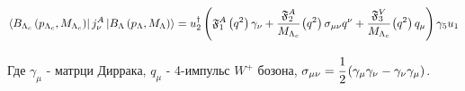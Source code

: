 \begin{equation}
    \bra{B_{\Lambda_c} \left( p_{\Lambda_c}, M_{\Lambda_c} \right)}
    j_\nu^A
    \ket{B_{\Lambda} \left( p_{\Lambda}, M_{\Lambda} \right)} = 
    u_2^\dag \left( \mathfrak F^A_1 \left( q^2 \right) \gamma_\nu + 
    \cfrac{\mathfrak F^A_2}{M_{\Lambda_c}} \left( q^2 \right) \sigma_{\mu\nu} q^\nu + 
    \cfrac{\mathfrak F^V_3}{M_{\Lambda_c}} \left( q^2 \right)q_\mu \right) \gamma_5 u_1 
\end{equation}

Где $\gamma_\mu$ - матрци Диррака, $q_\mu$ - 4-импульс $W^+$ бозона,
$\sigma_{\mu\nu} = \cfrac{1}{2} \left( \gamma_\mu \gamma_\nu - \gamma_\nu \gamma_\mu \right)$.





